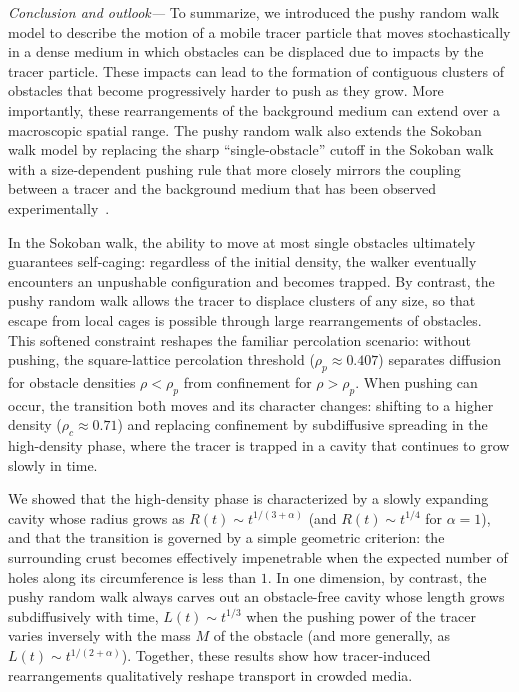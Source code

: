 \documentclass[reprint,superscriptaddress]{revtex4-2}
\begin{document}
\textit{Conclusion and outlook---} To summarize, we introduced the pushy random walk model to describe the motion of a mobile tracer particle that moves stochastically in a dense medium in which obstacles can be displaced due to impacts by the tracer particle. These impacts can lead to the formation of contiguous clusters of obstacles that become progressively harder to push as they grow. More importantly, these rearrangements of the background medium can extend over a macroscopic spatial range. The pushy random walk also extends the Sokoban walk model by replacing the sharp “single-obstacle” cutoff in the Sokoban walk with a size-dependent pushing rule that more closely mirrors the coupling between a tracer and the background medium that has been observed experimentally~\cite{Altshuler2024}.

In the Sokoban walk, the ability to move at most single obstacles ultimately guarantees self-caging: regardless of the initial density, the walker eventually encounters an unpushable configuration and becomes trapped. By contrast, the pushy random walk allows the tracer to displace clusters of any size, so that escape from local cages is possible through large rearrangements of obstacles. This softened constraint reshapes the familiar percolation scenario: without pushing, the square-lattice percolation threshold ($\rho_p\approx 0.407$) separates diffusion for obstacle densities $\rho<\rho_p$ from confinement for $\rho>\rho_p$.  When pushing can occur, the transition both moves and its character changes: shifting to a higher density ($\rho_c\approx 0.71$) and replacing confinement by subdiffusive spreading in the high-density phase, where the tracer is trapped in a cavity that continues to grow slowly in time.

We showed that the high-density phase is characterized by a slowly expanding cavity whose radius grows as $R(t)\sim t^{1/(3+\alpha)}$ (and $R(t)\sim t^{1/4}$ for $\alpha=1$), and that the transition is governed by a simple geometric criterion: the surrounding crust becomes effectively impenetrable when the expected number of holes along its circumference is less than $1$. In one dimension, by contrast, the pushy random walk always carves out an obstacle-free cavity whose length grows subdiffusively with time, $L(t)\sim t^{1/3}$ when the pushing power of the tracer varies inversely with the mass $M$ of the obstacle (and more generally, as $L(t)\sim t^{1/(2+\alpha)}$). Together, these results show how tracer-induced rearrangements qualitatively reshape transport in crowded media.
\end{document}
